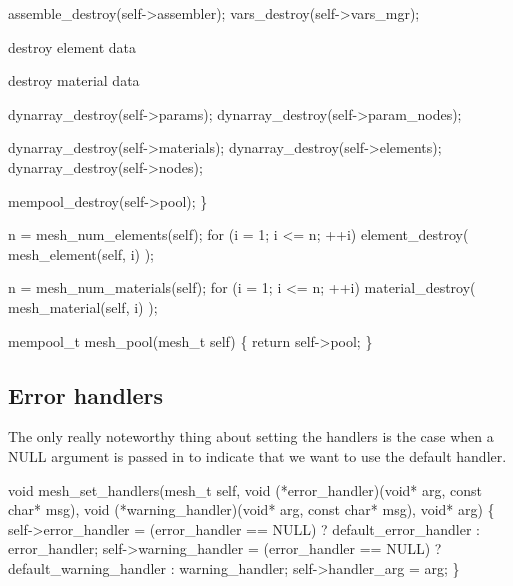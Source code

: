     assemble_destroy(self->assembler);
    vars_destroy(self->vars_mgr);

    \LA{}destroy element data~{\nwtagstyle{}}\RA{}

    \LA{}destroy material data~{\nwtagstyle{}}\RA{}

    dynarray_destroy(self->params);
    dynarray_destroy(self->param_nodes);

    dynarray_destroy(self->materials);
    dynarray_destroy(self->elements);
    dynarray_destroy(self->nodes);

    mempool_destroy(self->pool);
\}

\nwendcode{}\nwdocspar

\nwenddocs{}\endmoddef
n = mesh_num_elements(self);
for (i = 1; i <= n; ++i)
    element_destroy( mesh_element(self, i) );
\nwendcode{}\nwdocspar

\nwenddocs{}\endmoddef
n = mesh_num_materials(self);
for (i = 1; i <= n; ++i)
    material_destroy( mesh_material(self, i) );
\nwendcode{}\nwdocspar

\nwenddocs{}\plusendmoddef
mempool_t mesh_pool(mesh_t self)
\{
    return self->pool;
\}

\nwendcode{}\nwdocspar


\subsection{Error handlers}

The only really noteworthy thing about setting the handlers is the
case when a NULL argument is passed in to indicate that we want
to use the default handler.

\nwenddocs{}\plusendmoddef
void mesh_set_handlers(mesh_t self,
                       void (*error_handler)(void* arg, const char* msg),
                       void (*warning_handler)(void* arg, const char* msg),
                       void* arg)
\{
    self->error_handler = 
        (error_handler == NULL) ? default_error_handler : error_handler;
    self->warning_handler = 
        (error_handler == NULL) ? default_warning_handler : warning_handler;
    self->handler_arg = arg;
\}

